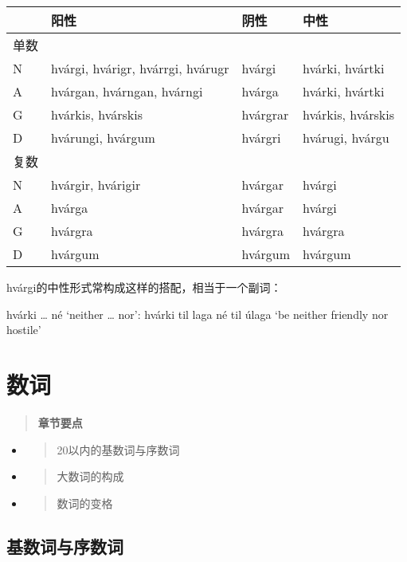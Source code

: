 \begin{longtable}{llll}
\toprule
 & 阳性 & 阴性 & 中性 \\
\midrule
\endhead
\bottomrule
\endfoot
单数 & & & \\
N & hvárgi, hvárigr, hvárrgi, hvárugr & hvárgi & hvárki, hvártki \\
A & hvárgan, hvárngan, hvárngi & hvárga & hvárki, hvártki \\
G & hvárkis, hvárskis & hvárgrar & hvárkis, hvárskis \\
D & hvárungi, hvárgum & hvárgri & hvárugi, hvárgu \\
复数 & & & \\
N & hvárgir, hvárigir & hvárgar & hvárgi \\
A & hvárga & hvárgar & hvárgi \\
G & hvárgra & hvárgra & hvárgra \\
D & hvárgum & hvárgum & hvárgum \\
\end{longtable}

hvárgi的中性形式常构成这样的搭配，相当于一个副词：

hvárki \ldots{} né `neither \ldots{} nor': hvárki til laga né til úlaga
`be neither friendly nor hostile'

\section{数词}\label{ux6570ux8bcd}

\begin{quote}
\textbf{章节要点}
\end{quote}

\begin{itemize}
\item
  \begin{quote}
  20以内的基数词与序数词
  \end{quote}
\item
  \begin{quote}
  大数词的构成
  \end{quote}
\item
  \begin{quote}
  数词的变格
  \end{quote}
\end{itemize}

\subsection{\texorpdfstring{\textbf{基数词与序数词}}{基数词与序数词}}\label{ux57faux6570ux8bcdux4e0eux5e8fux6570ux8bcd}

